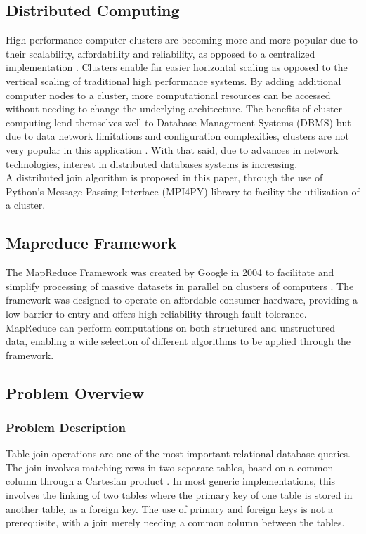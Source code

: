 \documentclass[10.5 pt, conference]{IEEEtran}
\begin{document}
\subsection{Distributed Computing}
High performance computer clusters are becoming more and more popular due to their scalability, affordability and reliability, as opposed to a centralized implementation \cite{Ceran2012}. Clusters enable far easier horizontal scaling as opposed to the vertical scaling of traditional high performance systems. By adding additional computer nodes to a cluster, more computational resources can be accessed without needing to change the underlying architecture. The benefits of cluster computing lend themselves well to Database Management Systems (DBMS) but due to data network limitations and configuration complexities, clusters are not very popular in this application \cite{Ceran2012}. With that said, due to advances in network technologies, interest in distributed databases systems is increasing. \\

A distributed join algorithm is proposed in this paper, through the use of Python’s Message Passing Interface (MPI4PY) library to facility the utilization of a cluster.

\subsection{Mapreduce Framework}
The MapReduce Framework was created by Google in 2004 to facilitate and simplify processing of massive datasets in parallel on clusters of computers \cite{McTaggart}. The framework was designed to operate on affordable consumer hardware, providing a low barrier to entry and offers high reliability through fault-tolerance. MapReduce can perform computations on both structured and unstructured data, enabling a wide selection of different algorithms to be applied through the framework. 

\subsection{Problem Overview}

\subsubsection{Problem Description}
Table join operations are one of the most important relational database queries. The join involves matching rows in two separate tables, based on a common column through a Cartesian product \cite{Mishra1992}. In most generic implementations, this involves the linking of two tables where the primary key of one table is stored in another table, as a foreign key. The use of primary and foreign keys is not a prerequisite, with a join merely needing a common column between the tables. \\
\end{document}
